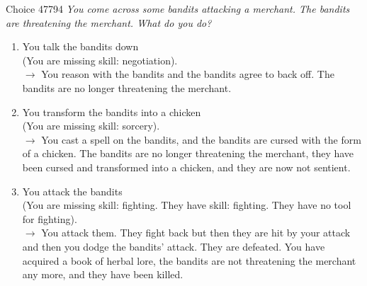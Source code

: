 \documentclass[xcolor=x11names]{beamer}
\newcommand{\choicecount}[1]{\fbox{\upshape \sffamily #1}}
\begin{document}
\begin{frame}{Choice 47794}
\scriptsize
\itshape
You come across some bandits attacking a merchant.
% 
The bandits are threatening the merchant.
% 
What do you do?

\begin{enumerate}
\item You talk the bandits down  \\
(You are missing skill: negotiation). \\[0.3em]
\choicecount{6}$\rightarrow$ You reason with the bandits and the bandits agree to back off.  The bandits are no longer threatening the merchant. \\[-0.5em]
\item You transform the bandits into a chicken  \\
(You are missing skill: sorcery). \\[0.3em]
\choicecount{1}$\rightarrow$ You cast a spell on the bandits, and the bandits are cursed with the form of a chicken. The bandits are no longer threatening the merchant, they have been cursed and transformed into a chicken, and they are now not sentient. \\[-0.5em]
\item You attack the bandits  \\
(You are missing skill: fighting. They have skill: fighting. They have no tool for fighting). \\[0.3em]
\choicecount{3}$\rightarrow$ You attack them. They fight back but then they are hit by your attack and then you dodge the bandits' attack. They are defeated. You have acquired a book of herbal lore, the bandits are not threatening the merchant any more, and they have been killed.
\end{enumerate}
\end{frame}
\end{document}
